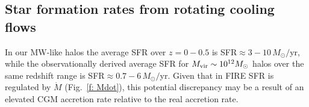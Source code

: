 \documentclass[fleqn,usenatbib]{mnras}
\newcommand{\Mdot}{\dot{M}}
\begin{document}

\subsection{Star formation rates from rotating cooling flows}
\label{s: fueling}


In our MW-like halos the average SFR over $z=0-0.5$ is SFR$\approx 3-10\,M_\odot/$yr, while the observationally derived average SFR for $M_{\rm vir} \sim 10^{12} M_\odot$ halos over the same redshift range is SFR$\approx 0.7-6\,M_\odot/$yr.
Given that in FIRE SFR is regulated by $\Mdot$ (Fig.~\ref{f: Mdot}), this potential discrepancy may be a result of an elevated CGM accretion rate relative to the real accretion rate.
\end{document}
